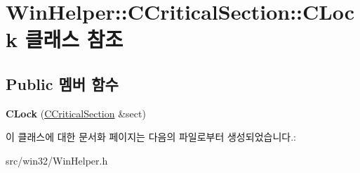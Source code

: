 \hypertarget{class_win_helper_1_1_c_critical_section_1_1_c_lock}{}\section{Win\+Helper\+:\+:C\+Critical\+Section\+:\+:C\+Lock 클래스 참조}
\label{class_win_helper_1_1_c_critical_section_1_1_c_lock}
\subsection*{Public 멤버 함수}
\begin{DoxyCompactItemize}
\item 
\mbox{\label{class_win_helper_1_1_c_critical_section_1_1_c_lock_a68cee1cb129d83775f678a4bde96c049}} 
{\bfseries C\+Lock} (\mbox{\hyperlink{class_win_helper_1_1_c_critical_section}{C\+Critical\+Section}} \&sect)
\end{DoxyCompactItemize}


이 클래스에 대한 문서화 페이지는 다음의 파일로부터 생성되었습니다.\+:\begin{DoxyCompactItemize}
\item 
src/win32/Win\+Helper.\+h\end{DoxyCompactItemize}
